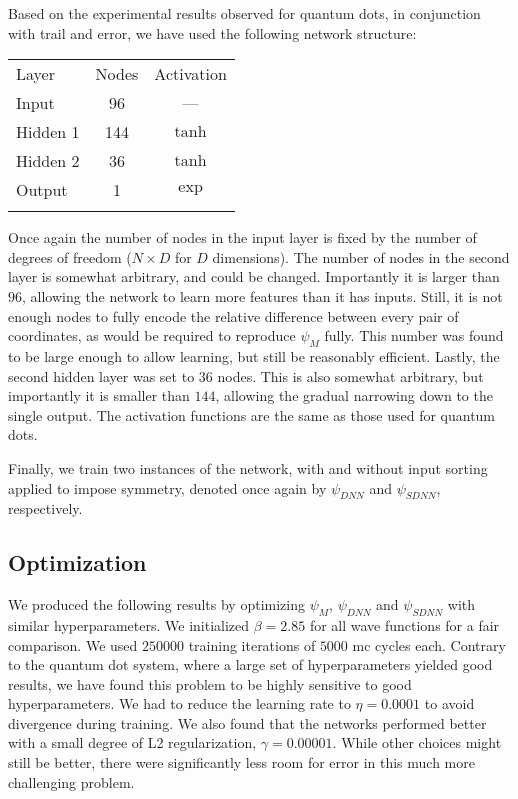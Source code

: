 \documentclass[Thesis.tex]{subfiles}
\begin{document}
Based on the experimental results observed for quantum dots, in conjunction with
trail and error, we have used the following network structure:

\begin{center}
  \begin{tabular}{lcc}
    \toprule
    \addlinespace
    Layer & Nodes & Activation\\
    \addlinespace
    \midrule
    \addlinespace
    \addlinespace
    Input & 96 & ---\\
    Hidden 1& 144 & $\tanh$\\
    Hidden 2& 36 & $\tanh$\\
    Output & 1 & $\exp$\\
    \addlinespace
    \addlinespace
    \bottomrule
  \end{tabular}
\end{center}
Once again the number of nodes in the input layer is fixed by the
number of degrees of freedom ($N\times D$ for $D$ dimensions). The number of
nodes in the second layer is somewhat arbitrary, and could be changed.
Importantly it is larger than $96$, allowing the network to learn more features
than it has inputs. Still, it is not enough nodes to fully encode the relative
difference between every pair of coordinates, as would be required to reproduce
$\psi_M$ fully. This number was found to be large enough to allow learning, but
still be reasonably efficient. Lastly, the second hidden layer was set to $36$
nodes. This is also somewhat arbitrary, but importantly it is smaller than
$144$, allowing the gradual narrowing down to the single output. The activation
functions are the same as those used for quantum dots.

Finally, we train two instances of the network, with and without input sorting
applied to impose symmetry, denoted once again by $\psi_{DNN}$ and
$\psi_{SDNN}$, respectively.


\subsection{Optimization}

We produced the following results by optimizing $\psi_M$, $\psi_{DNN}$ and $\psi_{SDNN}$ with
similar hyperparameters. We initialized $\beta=\num{2.85}$ for all wave functions
for a fair comparison. We used $\num{250000}$ training iterations of
$\num{5000}$ \gls{mc} cycles each. Contrary to the quantum dot system, where a large
set of hyperparameters yielded good results, we have found this problem to be
highly sensitive to good hyperparameters. We had to reduce the learning rate to
$\eta=\num{0.0001}$ to avoid divergence during training. We also found that the
networks performed better with a small degree of L2 regularization,
$\gamma=\num{0.00001}$. While other choices might still be better, there were
significantly less room for error in this much more challenging problem.
\end{document}
